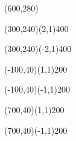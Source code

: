 \documentclass[12pt]{article}
\begin{document}
\begin{figure}[htb]
\hspace*{\fill}
\begin{egame}(600,280)

\renewcommand{\egarrowstyle}{}

%
\putbranch(300,240)(2,1){400}

\renewcommand{\egarrowstyle}{}

\putbranch(300,240)(-2,1){400}

\renewcommand{\egarrowstyle}{}

\putbranch(-100,40)(1,1){200}

\renewcommand{\egarrowstyle}{e}

\putbranch(-100,40)(-1,1){200}

\renewcommand{\egarrowstyle}{e}

\putbranch(700,40)(1,1){200}

\renewcommand{\egarrowstyle}{}
\putbranch(700,40)(-1,1){200}


\end{egame}
\end{figure}
\end{document}
